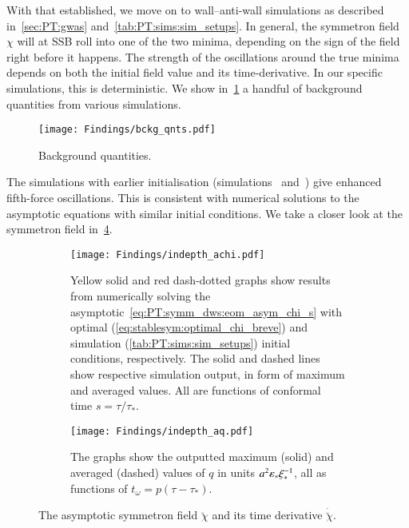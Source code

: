 With that established, we move on to wall--anti-wall simulations as described in~\cref{sec:PT:gwas} and~\cref{tab:PT:sims:sim_setups}. %
In general, the symmetron field $\chi$ will at SSB roll into one of the two minima, depending on the sign of the field right before it happens. The strength of the oscillations around the true minima depends on both the initial field value and its time-derivative. In our specific simulations, this is deterministic. %
We show in~\cref{fig:results:achi:bckg_qnts} a handful of background quantities from various simulations. %
\begin{figure}[h]
    \centering
    \texttt{[image: Findings/bckg\_qnts.pdf]}
    \caption{Background quantities. }
    \label{fig:results:achi:bckg_qnts}
\end{figure}
The simulations with earlier initialisation (simulations~ and~) give enhanced fifth-force oscillations. This is consistent with numerical solutions to the asymptotic equations with similar initial conditions. We take a closer look at the symmetron field in~\cref{fig:results:achi:indepth_achi_aq}. %


\begin{figure}[ht]
    \centering
    \begin{subfigure}[b]{\linewidth}
        \centering
        \texttt{[image: Findings/indepth\_achi.pdf]}
        \caption{Yellow solid and red dash-dotted graphs show results from numerically solving the asymptotic~\cref{eq:PT:symm_dws:eom_asym_chi_s} with optimal (\cref{eq:stablesym:optimal_chi_breve}) and simulation (\cref{tab:PT:sims:sim_setups}) initial conditions, respectively. The solid and dashed lines show respective simulation output, in form of maximum and averaged values. All are functions of conformal time $s=\tau/\tau_\ast$.}
        \label{fig:results:achi:indepth_achi}
    \end{subfigure}
    \hfill
    \begin{subfigure}[b]{\linewidth}
        \centering
        \texttt{[image: Findings/indepth\_aq.pdf]}
        \caption{The graphs show the outputted maximum (solid) and averaged (dashed) values of $q$ in units $a^2 \varepsilon_\ast \xi_\ast^{-1}$, all as functions of $t_\omega = p(\tau-\tau_\ast)$.}
        \label{fig:results:achi:indepth_aq}
    \end{subfigure}
    \caption{The asymptotic symmetron field $\breve{\chi}$ and its time derivative $\dot{\breve{\chi}}$.}
    \label{fig:results:achi:indepth_achi_aq}
\end{figure}

